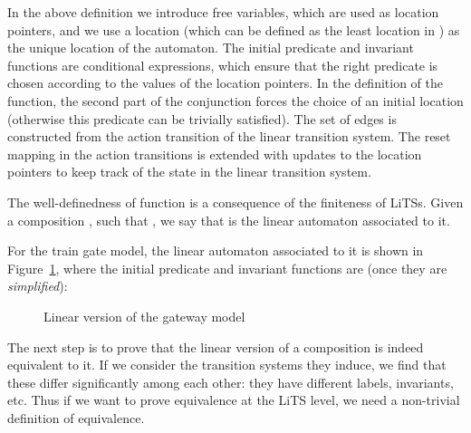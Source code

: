 \documentclass[submission,copyright,creativecommons,sharealike]{eptcs}
\begin{document}
In the above definition we introduce  free variables, which are
used as location pointers, and we use a location  (which can be
defined as the least location in ) as the unique location
of the automaton.
The initial predicate and invariant functions are conditional
expressions, which ensure that the right predicate is chosen according
to the values of the location pointers. In the definition of the
 function, the second part of the conjunction forces the choice
of an initial location (otherwise this predicate can be trivially
satisfied).
The set of edges is constructed from the action transition of the
linear transition system. The reset mapping in the action transitions
is extended with updates to the location pointers to keep track of the
state in the linear transition system.

The well-definedness of function  is a consequence of the
finiteness of LiTSs. Given a composition , such that , we
say that  is the linear automaton associated to it.

For the train gate model, the linear automaton associated to it is
shown in Figure~\ref{fig:linear-automaton}, where the initial
predicate and invariant functions are (once they are \emph{simplified}):


\begin{figure}[htb]
  \centering
  \caption{Linear version of the gateway
    model}\label{fig:linear-automaton}
\end{figure}



The next step is to prove that the linear version of a composition is
indeed equivalent to it.
If we consider the transition systems they induce, we find that these
differ significantly among each other: they have different labels,
invariants, etc. Thus if we want to prove equivalence at the LiTS
level, we need a non-trivial definition of equivalence.
\end{document}
